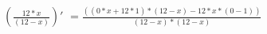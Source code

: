 \documentclass[a4paper, 12 pt]{article}
\begin{document}
	$\left(\frac{12*x}{(12-x)}\right)'$
	$= \frac{((0*x+12*1)*(12-x)-12*x*(0-1))}{(12-x)*(12-x)}$
\end{document}
